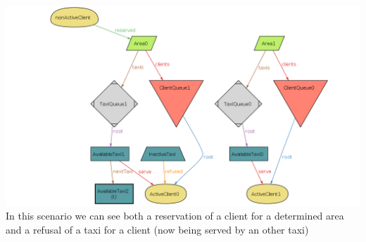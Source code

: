 \documentclass{article}
\begin{document}
\begin{center}
	\includegraphics[width=.9\textwidth,height=.9\textheight,keepaspectratio]{Alloy/reserved-and-refused}
	\\In this scenario we can see both a reservation of a client for a determined area and a refusal of a taxi for a client (now being served by an other taxi)
\end{center}
\end{document}
